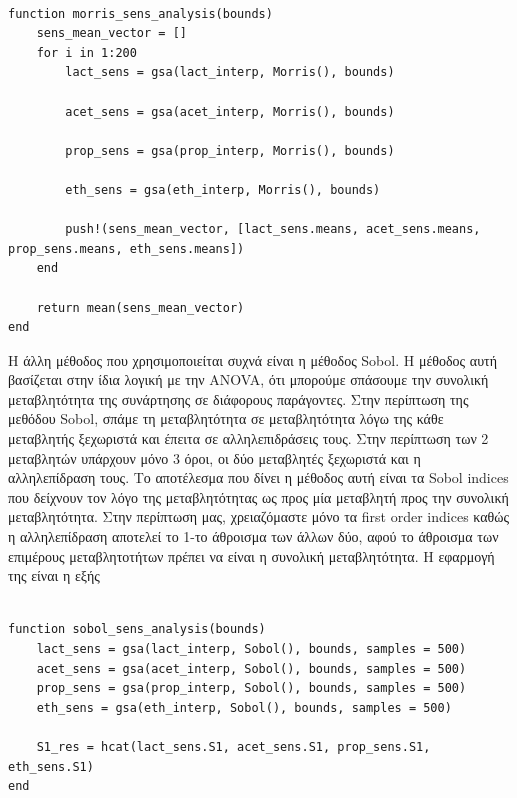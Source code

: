 \documentclass[11pt]{article}
\begin{document}
\begin{verbatim}

function morris_sens_analysis(bounds)
    sens_mean_vector = []
    for i in 1:200
        lact_sens = gsa(lact_interp, Morris(), bounds)

        acet_sens = gsa(acet_interp, Morris(), bounds)

        prop_sens = gsa(prop_interp, Morris(), bounds)

        eth_sens = gsa(eth_interp, Morris(), bounds)

        push!(sens_mean_vector, [lact_sens.means, acet_sens.means, prop_sens.means, eth_sens.means])
    end

    return mean(sens_mean_vector)
end

\end{verbatim}

Η άλλη μέθοδος που χρησιμοποιείται συχνά είναι η μέθοδος Sobol. Η μέθοδος αυτή βασίζεται στην ίδια λογική με την ANOVA, ότι μπορούμε σπάσουμε την συνολική μεταβλητότητα της συνάρτησης σε διάφορους παράγοντες. Στην περίπτωση της μεθόδου Sobol, σπάμε τη μεταβλητότητα σε μεταβλητότητα λόγω της κάθε μεταβλητής ξεχωριστά και έπειτα σε αλληλεπιδράσεις τους. Στην περίπτωση των 2 μεταβλητών υπάρχουν μόνο 3 όροι, οι δύο μεταβλητές ξεχωριστά και η αλληλεπίδραση τους. Το αποτέλεσμα που δίνει η μέθοδος αυτή είναι τα Sobol indices που δείχνουν τον λόγο της μεταβλητότητας ως προς μία μεταβλητή προς την συνολική μεταβλητότητα. Στην περίπτωση μας, χρειαζόμαστε μόνο τα first order indices καθώς η αλληλεπίδραση αποτελεί το 1-το άθροισμα των άλλων δύο, αφού το άθροισμα των επιμέρους μεταβλητοτήτων πρέπει να είναι η συνολική μεταβλητότητα. Η εφαρμογή της είναι η εξής

\begin{verbatim}

function sobol_sens_analysis(bounds)
    lact_sens = gsa(lact_interp, Sobol(), bounds, samples = 500)
    acet_sens = gsa(acet_interp, Sobol(), bounds, samples = 500)
    prop_sens = gsa(prop_interp, Sobol(), bounds, samples = 500)
    eth_sens = gsa(eth_interp, Sobol(), bounds, samples = 500)

    S1_res = hcat(lact_sens.S1, acet_sens.S1, prop_sens.S1, eth_sens.S1)
end

\end{verbatim}
\end{document}
